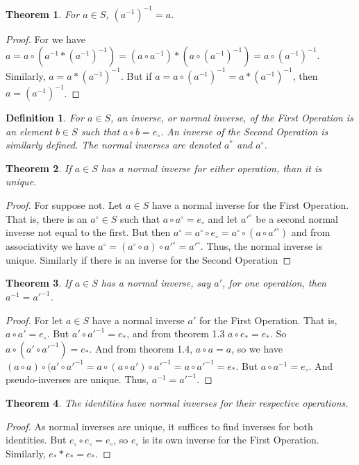 \documentclass[crop=false,class=book]{standalone}
\theoremstyle{mystyle}
\newtheorem{theorem}{Theorem}[section]
\newtheorem{definition}{Definition}[section]
\begin{document}
\begin{theorem} For $a\in S$, $(a^{-1})^{-1} =a$.
\end{theorem}
\begin{proof} For we have $a = a\circ (a^{-1}* (a^{-1})^{-1}) = (a\circ a^{-1})*(a\circ (a^{-1})^{-1}) =a \circ (a^{-1})^{-1}$. Similarly, $a = a* (a^{-1})^{-1}$. But if $a = a\circ (a^{-1})^{-1} = a*(a^{-1})^{-1}$, then $a = (a^{-1})^{-1}$.
\end{proof}
\begin{definition} For $a\in S$, an inverse, or normal inverse, of the First Operation is an element $b\in S$ such that $a\circ b=e_{\circ}$. An inverse of the Second Operation is similarly defined. The normal inverses are denoted $a^{*}$ and $a^{\circ}$.
\end{definition}
\begin{theorem} If $a\in S$ has a normal inverse for either operation, than it is unique.
\end{theorem}
\begin{proof} For suppose not. Let $a\in S$ have a normal inverse for the First Operation. That is, there is an $a^{\circ}\in S$ such that $a\circ a^{\circ}=e_{\circ}$ and let $a'^{\circ}$ be a second normal inverse not equal to the first. But then $a^{\circ}=a^{\circ}\circ e_{\circ}=a^{\circ}\circ (a\circ a'^{\circ})$ and from associativity we have $a^{\circ}=(a^{\circ}\circ a)\circ a'^{\circ}=a'^{\circ}$. Thus, the normal inverse is unique. Similarly if there is an inverse for the Second Operation
\end{proof}
\begin{theorem} If $a\in S$ has a normal inverse, say $a'$, for one operation, then $a^{-1}=a'^{-1}$.
\end{theorem}
\begin{proof} For let $a\in S$ have a normal inverse $a'$ for the First Operation. That is, $a\circ a' = e_{\circ}$. But $a' \circ a'^{-1}=e_{*}$, and from theorem 1.3 $a\circ e_{*}=e_{*}$. So $a\circ (a' \circ a'^{-1})=e_{*}$. And from theorem 1.4, $a\circ a=a$, so we have $(a\circ a)\circ (a'\circ a'^{-1}=a\circ (a\circ a')\circ a'^{-1}=a\circ a'^{-1}=e_{*}$. But $a\circ a^{-1}=e_{\circ}$. And pseudo-inverses are unique. Thus, $a^{-1}=a'^{-1}$. 
\end{proof}
\begin{theorem} The identities have normal inverses for their respective operations.
\end{theorem}
\begin{proof} As normal inverses are unique, it suffices to find inverses for both identities. But $e_{\circ}\circ e_{\circ}=e_{\circ}$, so $e_{\circ}$ is its own inverse for the First Operation. Similarly, $e_{*}*e_{*}=e_{*}$.
\end{proof}
\end{document}
